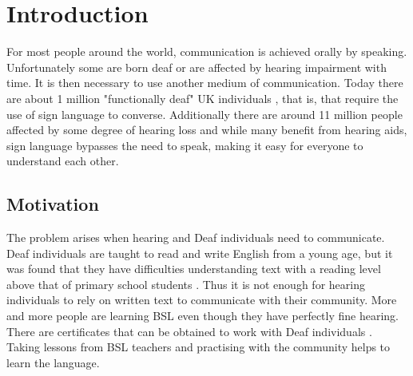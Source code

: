 \documentclass[12pt]{ociamthesis}  %
\begin{document}
\chapter{Introduction}
For most people around the world, communication is achieved orally by speaking. Unfortunately some are born deaf or are affected by hearing impairment with time. It is then necessary to use another medium of communication. Today there are about 1 million "functionally deaf" UK individuals , that is, that require the use of sign language to converse. Additionally there are around 11 million people affected by some degree of hearing loss and while many benefit from hearing aids, sign language bypasses the need to speak, making it easy for everyone to understand each other.  

\section{Motivation}
The problem arises when hearing and Deaf individuals need to communicate. Deaf individuals are taught to read and write English from a young age, but it was found that they have difficulties understanding text with a reading level above that of primary school students . Thus it is not enough for hearing individuals to rely on written text to communicate with their community. More and more people are learning BSL even though they have perfectly fine hearing. There are certificates that can be obtained to work with Deaf individuals . Taking lessons from BSL teachers and practising with the community helps to learn the language.
\end{document}
